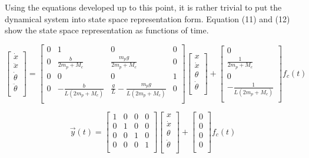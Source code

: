\documentclass[titlepage]{article}
\begin{document}
Using the equations developed up to this point, it is rather trivial to put the dynamical system into state space representation form.
Equation (11) and (12) show the state space representation as functions of time.

\begin{equation}
\begin{bmatrix}
\dot{x}\\
\ddot{x}\\
\dot{\theta}\\
\ddot{\theta}\\
\end{bmatrix} =
\begin{bmatrix}
0 & 1  & 0 & 0\\
0 & \frac{b}{2m_{p} + M_{c}}  & \frac{m_{p}g}{2m_{p} + M_{c}} & 0\\
0 & 0  & 0 & 1\\
0 & -\frac{b}{L\left(2m_{p} + M_{c}\right)}  & \frac{g}{L} - \frac{m_{p}g}{L\left(2m_{p} + M_{c}\right)} & 0\\
\end{bmatrix}
\begin{bmatrix}
x\\
\dot{x}\\
\theta\\
\dot{\theta}\\
\end{bmatrix}+ \begin{bmatrix}
0\\
\frac{1}{2m_{p} + M_{c}}\\
0\\
-\frac{1}{L\left(2m_{p} + M_{c}\right)}\\
\end{bmatrix} f_{c}\left(t\right)
\end{equation}

\begin{equation}
\vec{y}\left(t\right) = \begin{bmatrix}
1 & 0  & 0 & 0\\
0 & 1  & 0 & 0\\
0 & 0  & 1 & 0\\
0 & 0  & 0 & 1\\
\end{bmatrix} \begin{bmatrix}
x\\
\dot{x}\\
\theta\\
\dot{\theta}\\
\end{bmatrix} + \begin{bmatrix}
0\\
0\\
0\\
0\\
\end{bmatrix} f_{c}\left(t\right)
\end{equation}
\end{document}
